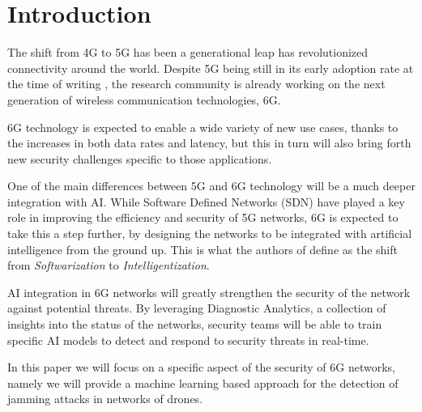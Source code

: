 \documentclass[futureinternet,article,submit,pdftex,moreauthors]{Definitions/mdpi}
\begin{document}
\section{Introduction}

The shift from 4G to 5G has been a generational leap has revolutionized connectivity around the world. 
Despite 5G being still in its early adoption rate at the time of writing \cite{5GStatisticsTaylor}, the research community is already working on the next generation of wireless communication technologies, 6G. 

6G technology is expected to enable a wide variety of new use cases, thanks to the increases in both data rates and latency, but this in turn 
will also bring forth new security challenges specific to those applications. 

One of the main differences between 5G and 6G technology will be a much deeper integration with AI. While Software Defined Networks (SDN) have played a key role in improving the efficiency and security 
of 5G networks, 6G is expected to take this a step further, by designing the networks to be integrated with artificial intelligence from the ground up. This is what the authors of \cite{6GRoadmapLetaief} define as 
the shift from \textit{Softwarization} to \textit{Intelligentization}.

AI integration in 6G networks will greatly strengthen the security of the network against potential threats. 
By leveraging Diagnostic Analytics, a collection of insights into the status of the networks, security teams 
will be able to train specific AI models to detect and respond to security threats in real-time.

In this paper we will focus on a specific aspect of the security of 6G networks, namely we will provide a machine learning based approach 
for the detection of jamming attacks in networks of drones. 
\end{document}
